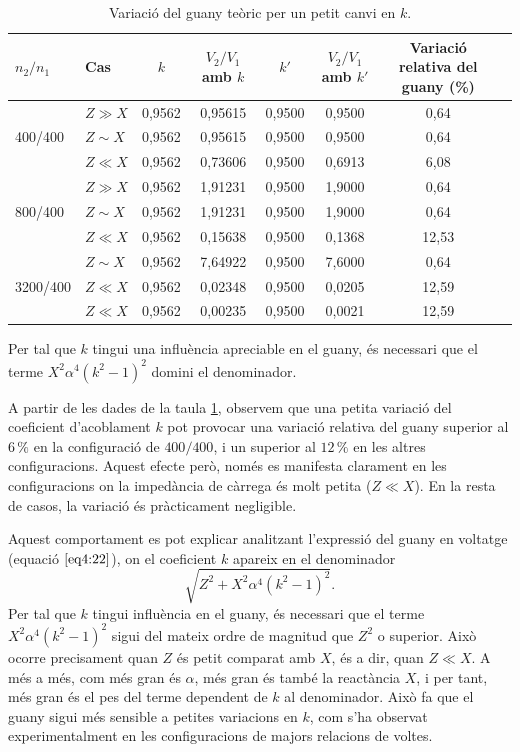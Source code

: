 \documentclass[a4paper,10.5pt]{report}
\begin{document}
\begin{table}[H]
	\centering
	\renewcommand{\arraystretch}{1.2}
	\caption{Variació del guany teòric per un petit canvi en $k$.}
	\begin{tabular}{llcccccc}
		\toprule
		$n_2/n_1$ & Cas & $k$ & $V_2/V_1$ amb $k$ & $k'$ & $V_2/V_1$ amb $k'$ & Variació relativa del guany (\%) \\
		\midrule
		& $Z \gg X$ & 0{,}9562 & 0{,}95615 & 0{,}9500 & 0{,}9500 & 0{,}64 \\
		400/400 & $Z \sim X$ & 0{,}9562 & 0{,}95615 & 0{,}9500 & 0{,}9500 & 0{,}64 \\
		& $Z \ll X$ & 0{,}9562 & 0{,}73606 & 0{,}9500 & 0{,}6913 & 6{,}08 \\
		\midrule
		& $Z \gg X$ & 0{,}9562 & 1{,}91231 & 0{,}9500 & 1{,}9000 & 0{,}64 \\
		800/400 & $Z \sim X$ & 0{,}9562 & 1{,}91231 & 0{,}9500 & 1{,}9000 & 0{,}64 \\
		& $Z \ll X$ & 0{,}9562 & 0{,}15638 & 0{,}9500 & 0{,}1368 & 12{,}53 \\
		\midrule
		& $Z \sim X$ & 0{,}9562 & 7{,}64922 & 0{,}9500 & 7{,}6000 & 0{,}64 \\
		3200/400 & $Z \ll X$ & 0{,}9562 & 0{,}02348 & 0{,}9500 & 0{,}0205 & 12{,}59 \\
		& $Z \ll X$ & 0{,}9562 & 0{,}00235 & 0{,}9500 & 0{,}0021 & 12{,}59 \\
		\bottomrule
	\end{tabular}
	\label{tab:4.6}
\end{table}

Per tal que \( k \) tingui una influència apreciable en el guany, és necessari que el terme \( X^2 \alpha^4 (k^2 - 1)^2 \) domini el denominador. 

A partir de les dades de la taula \ref{tab:4.6}, observem que una petita variació del coeficient d'acoblament $k$  pot provocar una variació relativa del guany superior al $6\,\%$ en la configuració de $400/400$, i un superior al $12\,\%$ en les altres configuracions. Aquest efecte però, només es manifesta clarament en les configuracions on la impedància de càrrega és molt petita ($Z \ll X$). En la resta de casos, la variació és pràcticament negligible.

Aquest comportament es pot explicar analitzant l'expressió del guany en voltatge (equació $\ref{eq4:22}$), on el coeficient $k$ apareix en el denominador
\begin{equation*}
	\sqrt{Z^2 + X^2 \alpha^4 (k^2 - 1)^2}.
\end{equation*}
Per tal que $k$ tingui influència en el guany, és necessari que el terme $X^2 \alpha^4 (k^2 - 1)^2$ sigui del mateix ordre de magnitud que $Z^2$ o superior. Això ocorre precisament quan $Z$ és petit comparat amb $X$, és a dir, quan $ Z \ll X $. A més a més, com més gran és $\alpha$, més gran és també la reactància $X $, i per tant, més gran és el pes del terme dependent de $k$ al denominador. Això fa que el guany sigui més sensible a petites variacions en $k$, com s’ha observat experimentalment en les configuracions de majors relacions de voltes. 
\end{document}
